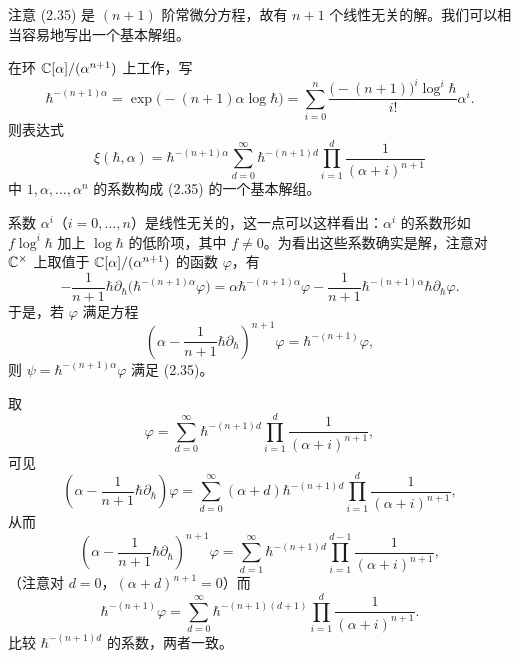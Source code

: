 注意 (2.35) 是 $(n+1)$ 阶常微分方程，故有 $n+1$ 个线性无关的解。我们可以相当容易地写出一个基本解组。

\begin{proposition}
在环 $\mathbb{C}[\alpha]/(\alpha^{n+1})$ 上工作，写
\[
  \hbar^{-(n+1)\alpha}
  =\exp\bigl(-(n+1)\alpha\log\hbar\bigr)
  =\sum_{i=0}^{n}\frac{\bigl(-(n+1)\bigr)^{i}\log^{i}\hbar}{i!}\alpha^{i}.
\]
则表达式
\begin{equation}
  \xi(\hbar,\alpha)
  =\hbar^{-(n+1)\alpha}\sum_{d=0}^{\infty}\hbar^{-(n+1)d}
  \prod_{i=1}^{d}\frac{1}{(\alpha+i)^{n+1}} \tag{2.36}
\end{equation}
中 $1,\alpha,\ldots,\alpha^{n}$ 的系数构成 (2.35) 的一个基本解组。
\end{proposition}

系数 $\alpha^{i}$（$i=0,\ldots,n$）是线性无关的，这一点可以这样看出：$\alpha^{i}$ 的系数形如 $f\log^{i}\hbar$ 加上 $\log\hbar$ 的低阶项，其中 $f\ne0$。为看出这些系数确实是解，注意对 $\mathbb{C}^\times$ 上取值于 $\mathbb{C}[\alpha]/(\alpha^{n+1})$ 的函数 $\varphi$，有
\[
  -\frac{1}{n+1}\hbar\partial_\hbar
  \bigl(\hbar^{-(n+1)\alpha}\varphi\bigr)
  =\alpha\hbar^{-(n+1)\alpha}\varphi
  -\frac{1}{n+1}\hbar^{-(n+1)\alpha}\hbar\partial_\hbar\varphi.
\]
于是，若 $\varphi$ 满足方程
\[
  \left(\alpha-\frac{1}{n+1}\hbar\partial_\hbar\right)^{n+1}\varphi
  =\hbar^{-(n+1)}\varphi,
\]
则 $\psi=\hbar^{-(n+1)\alpha}\varphi$ 满足 (2.35)。

取
\[
  \varphi=\sum_{d=0}^{\infty}\hbar^{-(n+1)d}
  \prod_{i=1}^{d}\frac{1}{(\alpha+i)^{n+1}},
\]
可见
\[
  \left(\alpha-\frac{1}{n+1}\hbar\partial_\hbar\right)\varphi
  =\sum_{d=0}^{\infty}(\alpha+d)\hbar^{-(n+1)d}
  \prod_{i=1}^{d}\frac{1}{(\alpha+i)^{n+1}},
\]
从而
\[
  \left(\alpha-\frac{1}{n+1}\hbar\partial_\hbar\right)^{n+1}\varphi
  =\sum_{d=1}^{\infty}\hbar^{-(n+1)d}
  \prod_{i=1}^{d-1}\frac{1}{(\alpha+i)^{n+1}},
\]
（注意对 $d=0$，$(\alpha+d)^{n+1}=0$）而
\[
  \hbar^{-(n+1)}\varphi
  =\sum_{d=0}^{\infty}\hbar^{-(n+1)(d+1)}
  \prod_{i=1}^{d}\frac{1}{(\alpha+i)^{n+1}}.
\]
比较 $\hbar^{-(n+1)d}$ 的系数，两者一致。



